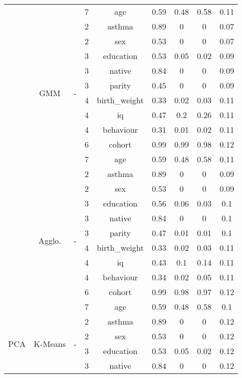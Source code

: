 \documentclass[CAT,BIB]{TFUOC}%
\begin{document}
\begin{table}
\begin{tabular}{@{}ccccccccc@{}}
            &  &  & 7 & age & 0.59 & 0.48 & 0.58 & 0.11 \\ \cmidrule(l){2-9}
            & \multirow{10}{*}{GMM} & \multirow{10}{*}{-} & 2 & asthma & 0.89 & 0 & 0 & 0.07 \\
            &  &  & 2 & sex & 0.53 & 0 & 0 & 0.07 \\
            &  &  & 3 & education & 0.53 & 0.05 & 0.02 & 0.09 \\
            &  &  & 3 & native & 0.84 & 0 & 0 & 0.09 \\
            &  &  & 3 & parity & 0.45 & 0 & 0 & 0.09 \\
            &  &  & 4 & birth\_weight & 0.33 & 0.02 & 0.03 & 0.11 \\
            &  &  & 4 & iq & 0.47 & 0.2 & 0.26 & 0.11 \\
            &  &  & 4 & behaviour & 0.31 & 0.01 & 0.02 & 0.11 \\
            &  &  & 6 & cohort & 0.99 & 0.99 & 0.98 & 0.12 \\
            &  &  & 7 & age & 0.59 & 0.48 & 0.58 & 0.11 \\ \cmidrule(l){2-9}
            & \multirow{10}{*}{Agglo.} & \multirow{10}{*}{-} & 2 & asthma & 0.89 & 0 & 0 & 0.09 \\
            &  &  & 2 & sex & 0.53 & 0 & 0 & 0.09 \\
            &  &  & 3 & education & 0.56 & 0.06 & 0.03 & 0.1 \\
            &  &  & 3 & native & 0.84 & 0 & 0 & 0.1 \\
            &  &  & 3 & parity & 0.47 & 0.01 & 0.01 & 0.1 \\
            &  &  & 4 & birth\_weight & 0.33 & 0.02 & 0.03 & 0.11 \\
            &  &  & 4 & iq & 0.43 & 0.1 & 0.14 & 0.11 \\
            &  &  & 4 & behaviour & 0.34 & 0.02 & 0.05 & 0.11 \\
            &  &  & 6 & cohort & 0.99 & 0.98 & 0.97 & 0.12 \\
            &  &  & 7 & age & 0.59 & 0.48 & 0.58 & 0.1 \\ \midrule
            \multirow{30}{*}{PCA} & \multirow{10}{*}{K-Means} & \multirow{10}{*}{-} & 2 & asthma & 0.89 & 0 & 0 & 0.12 \\
            &  &  & 2 & sex & 0.53 & 0 & 0 & 0.12 \\
            &  &  & 3 & education & 0.53 & 0.05 & 0.02 & 0.12 \\
            &  &  & 3 & native & 0.84 & 0 & 0 & 0.12 \\

\end{tabular}
\end{table}
\end{document}
